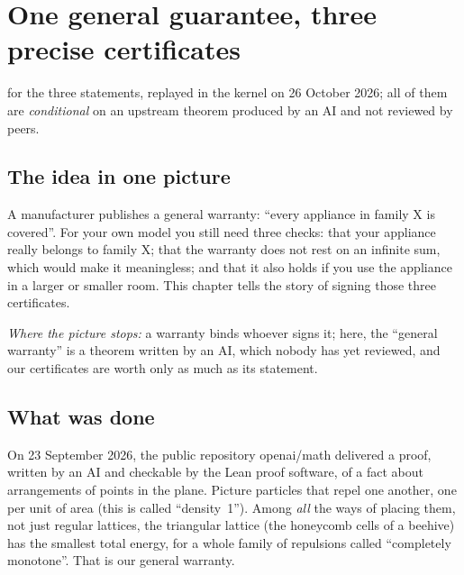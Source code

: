 \chapter[Three precise certificates]{One general guarantee, three precise certificates}

\noindent{} for the three statements, replayed in the kernel on 26 October 2026; all of them are
\emph{conditional} on an upstream theorem produced by an AI and not reviewed by peers.

\section*{The idea in one picture}

\begin{analogie}
A manufacturer publishes a general warranty: ``every appliance in family X is covered''. For your own model you
still need three checks: that your appliance really belongs to family X; that the warranty does not rest on an
infinite sum, which would make it meaningless; and that it also holds if you use the appliance in a larger or
smaller room. This chapter tells the story of signing those three certificates.

\emph{Where the picture stops:} a warranty binds whoever signs it; here, the ``general warranty'' is a theorem
written by an AI, which nobody has yet reviewed, and our certificates are worth only as much as its statement.
\end{analogie}

\section*{What was done}

On 23 September 2026, the public repository openai/math delivered a proof, written by an AI and checkable by the Lean
proof software, of a fact about arrangements of points in the plane. Picture particles that repel one another, one
per unit of area (this is called ``density~1''). Among \emph{all} the ways of placing them, not just regular
lattices, the triangular lattice (the honeycomb cells of a beehive) has the smallest total energy, for a whole
family of repulsions called ``completely monotone''. That is our general warranty.

